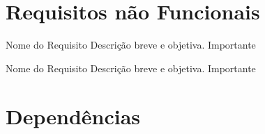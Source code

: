 \documentclass{report}
\begin{document}
\section{Requisitos não Funcionais}

  \begin{nonfunctional}
    \requirement
    {Nome do Requisito}
    {Descrição breve e objetiva.}
    {Importante}

    \requirement
    {Nome do Requisito}
    {Descrição breve e objetiva.}
    {Importante}
  \end{nonfunctional}

\section{Dependências}

  \begin{dependencies}

\end{dependencies}  

% 
% 
\end{document}
